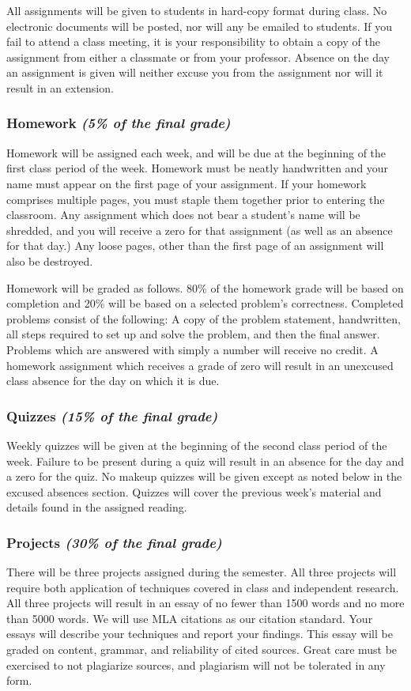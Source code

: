 \documentclass[11pt]{article}
\begin{document}
All assignments will be given to students in hard-copy format during
class. No electronic documents will be posted, nor will any be
emailed to students. If you fail to attend a class meeting, it is
your responsibility to obtain a copy of the assignment from either
a classmate or from your professor. Absence on the day an assignment
is given will neither excuse you from the assignment nor will it
result in an extension.

\subsubsection*{Homework {\em(5\% of the final grade)}}
Homework will be assigned each
week, and will be due at the beginning of the first class period of
the week. Homework must be neatly handwritten and your name must
appear on the first page of your assignment. If your homework
comprises multiple pages, you must staple them together prior to
entering the classroom. Any assignment which does not bear
a student's name will be shredded, and you will receive a zero for
that assignment (as well as an absence for that day.) Any loose pages,
other than the first page of an assignment will also be destroyed.

Homework will be graded as follows. 80\% of the homework grade will be
based on completion and 20\% will be based on a selected problem's
correctness. Completed problems consist of the following: A copy of
the problem statement, handwritten, all steps required to set up and
solve the problem, and then the final answer. Problems which are answered
with simply a number will receive no credit. A homework assignment
which receives a grade of zero will result in an unexcused class absence for
the day on which it is due.

\subsubsection*{Quizzes {\em(15\% of the final grade)}}
Weekly quizzes will be given at
the beginning of the second class period of the week.  Failure to be present
during a quiz will result in an absence for the day and a zero for
the quiz. No makeup quizzes will be given except as noted below in
the excused absences section. Quizzes will cover the previous week's
material and details found in the assigned reading.

\subsubsection*{Projects {\em (30\% of the final grade)}}
There will be three projects
assigned during the semester. All three projects will require both
application of techniques covered in class and independent research.
All three projects will result in an essay of no fewer than 1500 words and no more than 5000 words. We will use MLA citations as our citation standard.  Your essays will describe your techniques and report your
findings. This essay will be graded on content, grammar, and
reliability of cited sources. Great care must be exercised to not
plagiarize sources, and plagiarism will not be tolerated in any form.
\end{document}
